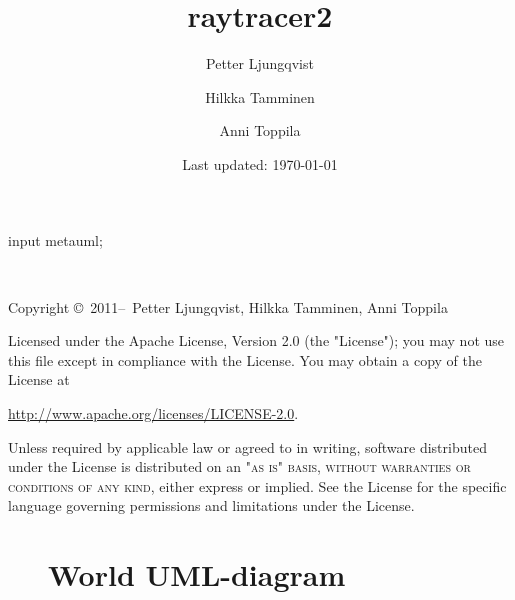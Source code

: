 \documentclass[a4paper,titlepage]{article}
\title{raytracer2}
\author{
	Petter Ljungqvist \and
	Hilkka Tamminen \and
	Anni Toppila}
\date{Last updated: \today}
\newenvironment{narrow}[2]{%
\begin{list}{}{%
\setlength{\topsep}{0pt}%
\setlength{\leftmargin}{#1}%
\setlength{\rightmargin}{#2}%
\setlength{\listparindent}{\parindent}%
\setlength{\itemindent}{\parindent}%
\setlength{\parsep}{\parskip}}%
\item[]}{\end{list}}
\begin{document}
	\begin{empfile}
		\begin{empcmds}
			input metauml;
		\end{empcmds}
	
		
		\maketitle
		
		\newpage
~\vfill
\thispagestyle{empty}
{\parindent0pt
\parskip15pt
Copyright \copyright\ 2011--\the\year\ 
	{Petter Ljungqvist,
	Hilkka Tamminen,
	Anni Toppila}

\par Licensed under the Apache License, Version 2.0 (the "License");
   you may not use this file except in compliance with the License.
   You may obtain a copy of the License at

\hspace{15mm}\url{http://www.apache.org/licenses/LICENSE-2.0}. 

Unless required by applicable law or agreed to in writing, software
   distributed under the License is distributed on an \textsc{"as is" basis,
   without warranties or conditions of any kind}, either express or implied.
   See the License for the specific language governing permissions and
   limitations under the License.
}

		
		
		
		\tableofcontents
		
		\clearpage
		

		
		
		
		
		
		
	
		\clearpage
		\appendix
		
		

		
		
		
			\begin{figure}
				\section{World UML-diagram} 
				\label{f:world}
				\begin{narrow}{-40pt}{-40pt}
					\centering
					
				\end{narrow}
			\end{figure}
			
		
	\end{empfile}
\end{document}
